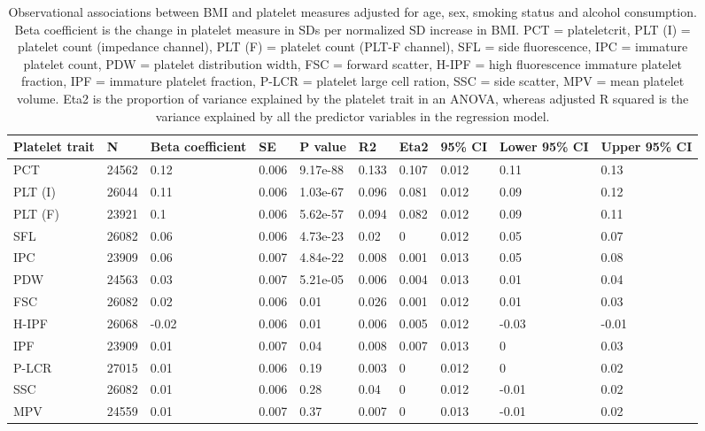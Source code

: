 \documentclass[11pt,twoside]{bristolthesis}
\begin{document}
\begin{landscape}\begin{table}

\caption[Observational associations between BMI and platelet measures adjusted for age, sex, smoking status and alcohol consumption]{\label{tab:BMI-platelets-adjust}Observational associations between BMI and platelet measures adjusted for age, sex, smoking status and alcohol consumption. Βeta coefficient is the change in platelet measure in SDs per normalized SD increase in BMI. PCT = plateletcrit, PLT (I) = platelet count (impedance channel), PLT (F) = platelet count (PLT-F channel), SFL = side fluorescence, IPC = immature platelet count, PDW = platelet distribution width, FSC = forward scatter, H-IPF = high fluorescence immature platelet fraction, IPF = immature platelet fraction, P-LCR = platelet large cell ration, SSC = side scatter, MPV = mean platelet volume. Eta2 is the proportion of variance explained by the platelet trait in an ANOVA, whereas adjusted R squared is the variance explained by all the predictor variables in the regression model.}
\centering
\begin{tabu} to 
\toprule
Platelet trait & N & Βeta coefficient & SE & P value & R2 & Eta2 & 95\% CI & Lower 95\% CI & Upper 95\% CI\\
\midrule
PCT & 24562 & 0.12 & 0.006 & 9.17e-88 & 0.133 & 0.107 & 0.012 & 0.11 & 0.13\\
PLT (I) & 26044 & 0.11 & 0.006 & 1.03e-67 & 0.096 & 0.081 & 0.012 & 0.09 & 0.12\\
PLT (F) & 23921 & 0.1 & 0.006 & 5.62e-57 & 0.094 & 0.082 & 0.012 & 0.09 & 0.11\\
SFL & 26082 & 0.06 & 0.006 & 4.73e-23 & 0.02 & 0 & 0.012 & 0.05 & 0.07\\
IPC & 23909 & 0.06 & 0.007 & 4.84e-22 & 0.008 & 0.001 & 0.013 & 0.05 & 0.08\\
\addlinespace
PDW & 24563 & 0.03 & 0.007 & 5.21e-05 & 0.006 & 0.004 & 0.013 & 0.01 & 0.04\\
FSC & 26082 & 0.02 & 0.006 & 0.01 & 0.026 & 0.001 & 0.012 & 0.01 & 0.03\\
H-IPF & 26068 & -0.02 & 0.006 & 0.01 & 0.006 & 0.005 & 0.012 & -0.03 & -0.01\\
IPF & 23909 & 0.01 & 0.007 & 0.04 & 0.008 & 0.007 & 0.013 & 0 & 0.03\\
P-LCR & 27015 & 0.01 & 0.006 & 0.19 & 0.003 & 0 & 0.012 & 0 & 0.02\\
\addlinespace
SSC & 26082 & 0.01 & 0.006 & 0.28 & 0.04 & 0 & 0.012 & -0.01 & 0.02\\
MPV & 24559 & 0.01 & 0.007 & 0.37 & 0.007 & 0 & 0.013 & -0.01 & 0.02\\
\bottomrule
\end{tabu}
\end{table}
\end{landscape}
\end{document}
